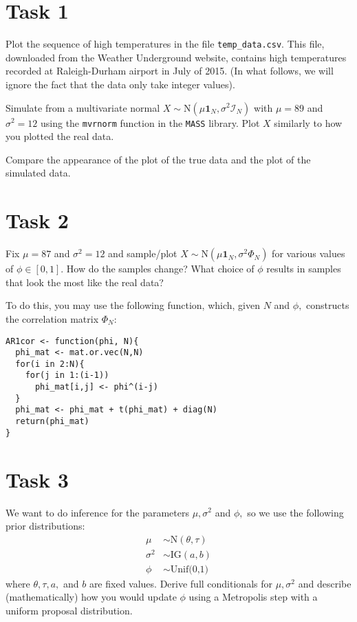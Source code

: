 \documentclass{article}
\begin{document}
\section*{Task 1}

Plot the sequence of high temperatures in the file \verb|temp_data.csv|. This file, downloaded from the Weather Underground website, contains high temperatures recorded at Raleigh-Durham airport in July of 2015. (In what follows, we will ignore the fact that the data only take integer values).

Simulate from a multivariate normal $X  \sim \text{N}(\mu\mathbf{1}_N, \sigma^2\mathcal{I}_N)$ with $\mu=89$ and $\sigma^2=12$ using the \verb|mvrnorm| function in the \verb|MASS| library. Plot $X$ similarly to how you plotted the real data. 

Compare the appearance of the plot of the true data and the plot of the simulated data. 

\section*{Task 2} 

Fix $\mu=87$ and $\sigma^2=12$ and sample/plot $X  \sim \text{N}(\mu\mathbf{1}_N, \sigma^2\Phi_N)$ for various values of $\phi\in[0,1].$ How do the samples change? What choice of $\phi$ results in samples that look the most like the real data?

To do this, you may use the following function, which, given $N$ and $\phi,$ constructs the correlation matrix $\Phi_N$: 

\begin{verbatim}
AR1cor <- function(phi, N){
  phi_mat <- mat.or.vec(N,N)
  for(i in 2:N){
    for(j in 1:(i-1))
      phi_mat[i,j] <- phi^(i-j)
  }
  phi_mat <- phi_mat + t(phi_mat) + diag(N)
  return(phi_mat)
}
\end{verbatim}

\section*{Task 3}

We want to do inference for the parameters $\mu,\sigma^2$ and $\phi,$ so we use the following prior distributions:
\begin{align*}
\mu &\sim \text{N}(\theta, \tau) \\ 
\sigma^2 &\sim \text{IG}(a,b) \\ 
\phi &\sim \text{Unif(0,1)}
\end{align*} where $\theta, \tau, a,$ and $b$ are fixed values. Derive full conditionals for $\mu,\sigma^2$ and describe (mathematically) how you would update $\phi$ using a Metropolis step with a uniform proposal distribution. 
\end{document}
